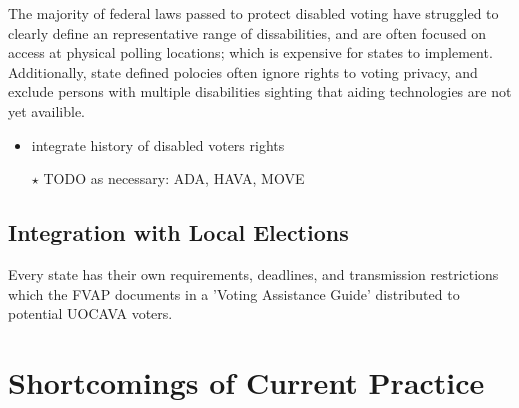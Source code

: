 The majority of federal laws passed to protect disabled voting have struggled to clearly define an representative range of dissabilities, and are often focused on access at physical polling locations; which is expensive for states to implement. Additionally, state defined polocies often ignore rights to voting privacy, and exclude persons with multiple disabilities sighting that aiding technologies are not yet availible.










\begin{itemize}
\item integrate history of disabled voters rights
\item[$\star$] TODO as necessary: ADA, HAVA, MOVE
\end{itemize}

\subsection{Integration with Local Elections}

Every state has their own requirements, deadlines, and transmission restrictions which the FVAP documents in a 'Voting Assistance Guide' distributed to potential UOCAVA voters. 

\section{Shortcomings of Current Practice}

